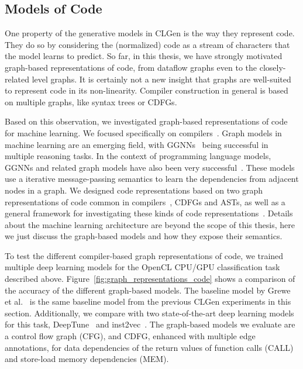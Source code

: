 \subsection{Models of Code}

One property of the generative models in CLGen is the way they represent code.
They do so by considering the (normalized) code as a stream of characters that the model learns to predict.
So far, in this thesis, we have strongly motivated graph-based representations of code, from dataflow graphs even to the closely-related level graphs.
It is certainly not a new insight that graphs are well-suited to represent code in its non-linearity.
Compiler construction in general is based on multiple graphs, like syntax trees or \acp{CDFG}.

Based on this observation, we investigated graph-based representations of code for machine learning.
We focused specifically on compilers~\cite{brauckmann_cc20}.
Graph models in machine learning are an emerging field, with \acp{GGNN}~\cite{gnn} being successful in multiple reasoning tasks.
In the context of programming language models, \acp{GGNN} and related graph models have also been very successful~\cite{allamanis2017learning,cummins_programl,ye2020deep,paliwal2020graph}.
These models use a iterative message-passing semantics to learn the dependencies from adjacent nodes in a graph. 
We designed code representations based on two graph representations of code common in compilers~\cite{brauckmann_cc20}, \acp{CDFG} and \acp{AST}, as well as a general framework for investigating these kinds of code representations~\cite{brauckmann_fdl20}.
Details about the machine learning architecture are beyond the scope of this thesis, here we just discuss the graph-based models and how they expose their semantics.

To test the different compiler-based graph representations of code, we trained~\cite{brauckmann_cc20} multiple deep learning models for the OpenCL \ac{CPU}/\ac{GPU} classification task described above.
Figure~\ref{fig:graph_representations_code} shows a comparison of the accuracy of the different graph-based models.
The baseline model by Grewe et al.~\cite{grewe_cgo13} is the same baseline model from the previous CLGen experiments in this section.
Additionally, we compare with two state-of-the-art deep learning models for this task, DeepTune~\cite{cummins_pact17} and inst2vec~\cite{inst2vec}.
The graph-based models we evaluate are a control flow graph (CFG), and \acf{CDFG}, enhanced with multiple edge annotations, for data dependencies of the return values of function calls (CALL) and store-load memory dependencies (MEM).

